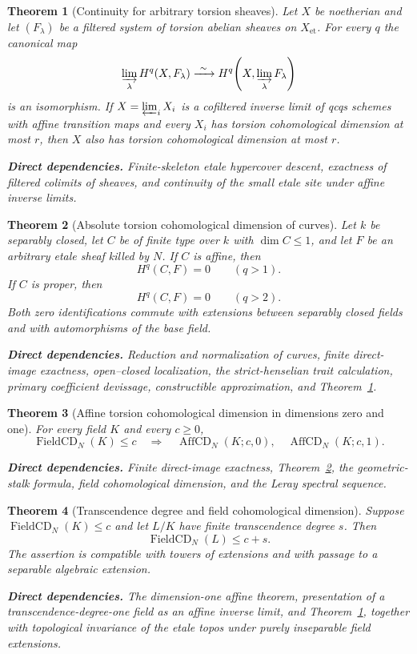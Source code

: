 \documentclass[10pt]{article}
\newtheorem{theorem}{Theorem}[section]
\theoremstyle{definition}
\newcommand{\deps}[1]{\par\smallskip\noindent\textbf{Direct dependencies.} #1}
\begin{document}
\begin{theorem}[Continuity for arbitrary torsion sheaves]
\label{thm:torsion-continuity}
Let $X$ be noetherian and let $(F_\lambda)$ be a filtered system of torsion
abelian sheaves on $X_{\mathrm{et}}$.  For every $q$ the canonical map
\[
 \varinjlim_\lambda H^q(X,F_\lambda)
 \xrightarrow{\ \sim\ }
 H^q\!\left(X,\varinjlim_\lambda F_\lambda\right)
\]
is an isomorphism.  If $X=\varprojlim_iX_i$ is a cofiltered inverse limit of
qcqs schemes with affine transition maps and every $X_i$ has torsion
cohomological dimension at most $r$, then $X$ also has torsion
cohomological dimension at most $r$.
\deps{Finite-skeleton etale hypercover descent, exactness of filtered
colimits of sheaves, and continuity of the small etale site under affine
inverse limits.}
\end{theorem}

\begin{theorem}[Absolute torsion cohomological dimension of curves]
\label{thm:absolute-curve-cd}
Let $k$ be separably closed, let $C$ be of finite type over $k$ with
$\dim C\leq1$, and let $F$ be an arbitrary etale sheaf killed by $N$.
If $C$ is affine, then
\[
 H^q(C,F)=0\qquad(q>1).
\]
If $C$ is proper, then
\[
 H^q(C,F)=0\qquad(q>2).
\]
Both zero identifications commute with extensions between separably closed
fields and with automorphisms of the base field.
\deps{Reduction and normalization of curves, finite direct-image exactness,
open--closed localization, the strict-henselian trait calculation, primary
coefficient devissage, constructible approximation, and
Theorem~\ref{thm:torsion-continuity}.}
\end{theorem}

\begin{theorem}[Affine torsion cohomological dimension in dimensions zero
and one]
\label{thm:affine-cd-base}
For every field $K$ and every $c\geq0$,
\[
 \operatorname{FieldCD}_N(K)\leq c
 \quad\Longrightarrow\quad
 \operatorname{AffCD}_N(K;c,0),\quad
 \operatorname{AffCD}_N(K;c,1).
\]
\deps{Finite direct-image exactness, Theorem~\ref{thm:absolute-curve-cd},
the geometric-stalk formula, field cohomological dimension, and the Leray
spectral sequence.}
\end{theorem}

\begin{theorem}[Transcendence degree and field cohomological dimension]
\label{thm:field-transcendence-cd}
Suppose $\operatorname{FieldCD}_N(K)\leq c$ and let $L/K$ have finite
transcendence degree $s$.  Then
\[
 \operatorname{FieldCD}_N(L)\leq c+s.
\]
The assertion is compatible with towers of extensions and with passage to a
separable algebraic extension.
\deps{The dimension-one affine theorem, presentation of a
transcendence-degree-one field as an affine inverse limit, and
Theorem~\ref{thm:torsion-continuity}, together with topological invariance of
the etale topos under purely inseparable field extensions.}
\end{theorem}
\end{document}
